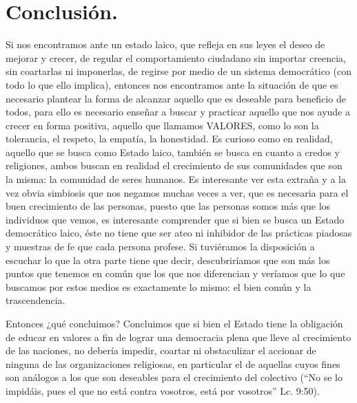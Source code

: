 \section{Conclusión.}
Si nos encontramos ante un estado laico, que refleja en sus leyes el deseo de mejorar y crecer, de regular el comportamiento ciudadano sin importar creencia, sin coartarlas ni imponerlas, de regirse por medio de un sistema democrático (con todo lo que ello implica), entonces nos encontramos ante la situación de que es necesario plantear la forma de alcanzar aquello que es deseable para beneficio de todos, para ello es necesario enseñar a buscar y practicar aquello que nos ayude a crecer en forma positiva, aquello que llamamos VALORES, como lo son la tolerancia, el respeto, la empatía, la honestidad. Es curioso como en realidad, aquello que se busca como Estado laico, también se busca en cuanto a credos y religiones, ambos buscan en realidad el crecimiento de sus comunidades que son la misma: la comunidad de seres humanos. Es interesante ver esta extraña y a la vez obvia simbiosis que nos negamos muchas veces a ver, que es necesaria para el buen crecimiento de las personas, puesto que las personas somos más que los individuos que vemos, es interesante comprender que si bien se busca un Estado democrático laico, éste no tiene que ser ateo ni inhibidor de las prácticas piadosas y muestras de fe que cada persona profese. Si tuviéramos la disposición a escuchar lo que la otra parte tiene que decir, descubriríamos que son más los puntos que tenemos en común que los que nos diferencian y veríamos que lo que buscamos por estos medios es exactamente lo mismo: el bien común y la trascendencia.

Entonces ¿qué concluimos? Concluimos que si bien el Estado tiene la obligación de educar en valores a fin de lograr una democracia plena que lleve al crecimiento de las naciones, no debería impedir, coartar ni obstaculizar el accionar de ninguna de las organizaciones religiosas, en particular el de aquellas cuyos fines son análogos a los que son deseables para el crecimiento del colectivo (“No se lo impidáis, pues el que no está contra vosotros, está por vosotros” Lc. 9:50).

